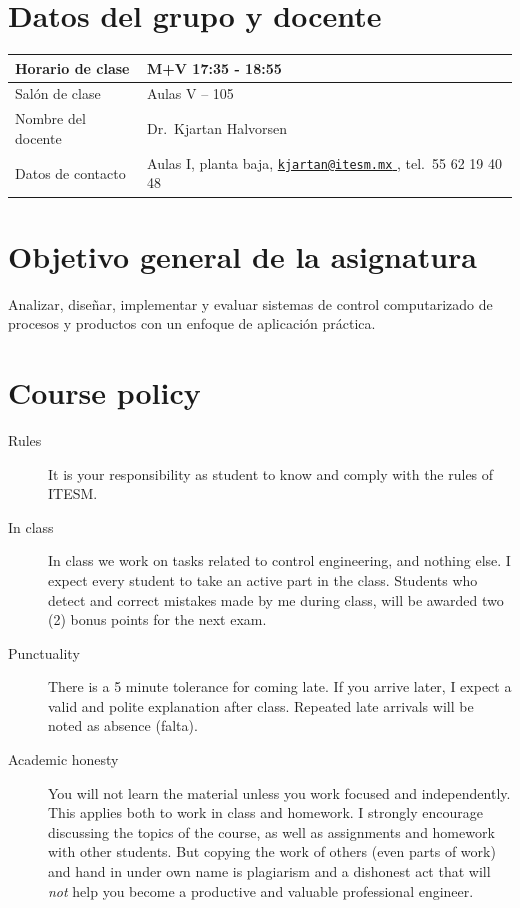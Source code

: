 \documentclass[letter, 10pt]{scrartcl}
\begin{document}
\section*{Datos del grupo y docente}
\begin{tabularx}{\linewidth}{|L|X|}
\hline
Horario de clase & M+V 17:35 - 18:55\\\hline
Salón de clase & Aulas V -- 105\\\hline
Nombre del docente & Dr.~Kjartan Halvorsen\\\hline
Datos de contacto & Aulas I, planta baja, \href{mailto:kjartan@itesm.mx}{\nolinkurl{kjartan@itesm.mx} }, tel.~55 62 19 40 48\\\hline
\end{tabularx}

\section*{Objetivo general de la asignatura}
Analizar, diseñar, implementar y evaluar sistemas de control computarizado de procesos y productos con un enfoque de aplicación práctica.

\section*{Course policy}
\begin{description}
\item[Rules] It is your responsibility as student to know and comply with the rules of ITESM.
\item[In class] In class we work on tasks related to control engineering, and nothing else. I expect every student to take an active part in the class. Students who detect and correct mistakes made by me during class, will be awarded two (2) bonus points for the next exam.  
\item[Punctuality] There is a 5 minute tolerance for coming late. If you arrive later, I expect a valid and polite explanation after class. Repeated late arrivals will be noted as absence (falta).
\item[Academic honesty] You will not learn the material unless you work focused and independently. This applies both to work in class and homework. I strongly encourage discussing the topics of the course,  as well as assignments and homework with other students. But copying the work of others (even parts of work) and hand in under own name is plagiarism and a dishonest act that will \emph{not} help you become a productive and valuable professional engineer. 
\end{description}
\end{document}
